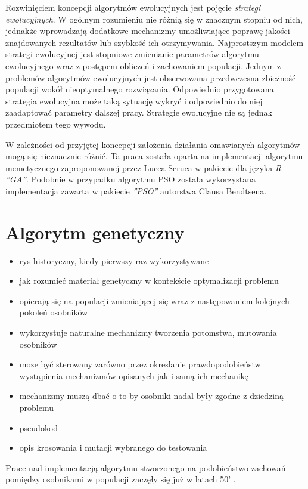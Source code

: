 \par 
Rozwinięciem koncepcji algorytmów ewolucyjnych jest pojęcie \emph{strategi ewolucyjnych}. W ogólnym rozumieniu nie różnią się w znacznym stopniu od nich, jednakże wprowadzają dodatkowe mechanizmy umożliwiające poprawę jakości znajdowanych rezultatów lub szybkość ich otrzymywania. Najprostszym modelem strategi ewolucyjnej jest stopniowe zmienianie parametrów algorytmu ewolucyjnego wraz z postępem obliczeń i zachowaniem populacji. Jednym z problemów algorytmów ewolucyjnych jest obserwowana przedwczesna zbieżność populacji wokół nieoptymalnego rozwiązania. Odpowiednio przygotowana strategia ewolucyjna może taką sytuację wykryć i odpowiednio do niej zaadaptować parametry dalszej pracy. Strategie ewolucyjne nie są jednak przedmiotem tego wywodu.
\par
W zależności od przyjętej koncepcji założenia działania omawianych algorytmów mogą się nieznacznie różnić. Ta praca została oparta na implementacji algorytmu memetycznego zaproponowanej przez Lucca Scruca w pakiecie dla języka \emph{R ''GA''}\cite{gaPackage}. Podobnie w przypadku algorytmu PSO została wykorzystana implementacja zawarta w pakiecie \emph{''PSO''} autorstwa Clausa Bendtsena\cite{psoPackage}.


\section{Algorytm genetyczny}
\begin{itemize}
\item rys historyczny, kiedy pierwszy raz wykorzystywane
\item jak rozumieć materiał genetyczny w kontekście optymalizacji problemu
\item opierają się na populacji zmieniającej się wraz z następowaniem kolejnych pokoleń osobników
\item wykorzystuje naturalne mechanizmy tworzenia potomstwa, mutowania osobników
\item moze być sterowany zarówno przez okreslanie prawdopodobieństw wystąpienia mechanizmów opisanych jak i samą ich mechanikę
\item mechanizmy muszą dbać o to by osobniki nadal były zgodne z dziedziną problemu
\item pseudokod
\item opis krosowania i mutacji wybranego do testowania
\end{itemize} 
Prace nad implementacją algorytmu stworzonego na podobieństwo zachowań pomiędzy osobnikami w populacji zaczęły się już w latach 50' \cite{barker1958simulation}. 

